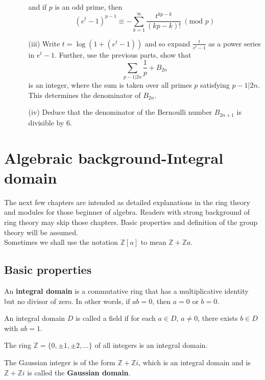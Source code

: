 \begin{enumerate}
\begin{enumerate}
    and if $p$ is an odd prime, then
    $$(e^t-1)^{p-1} \equiv -\sum_{k=1}^\infty \frac{t^{kp-k}}{(kp-k)!}~(\text{mod } p)$$
    \item[(iii)] Write $t=\log{(1+(e^t-1))}$ and so expand $\frac{t}{e^t-1}$ as a power series in
    $e^t-1$. Further, use the previous parts, show that
    $$\sum_{p-1 \big|2n} \frac{1}{p}+B_{2n}$$ is an integer, where the sum is taken over all primes $p$ satisfying $p-1 \big|2n$. This determines the denominator of $B_{2n}$.
    \item[(iv)] Deduce that the denominator of the Bernoulli number $B_{2n+1}$ is divisible by $6$.
    \end{enumerate}
\end{enumerate}

\section{Algebraic background-Integral domain}

The next few chapters are intended as  detailed explanations in the ring theory and modules for those beginner of algebra. Readers with strong background of ring theory may skip those chapters. Basic properties and definition of the group theory will be assumed.\\
Sometimes we shall use the notation $\mathbb{Z}[a]$ to mean $\mathbb{Z}+\mathbb{Z}a$.

\subsection{Basic properties}

\begin{definition} 
An {\bf integral domain} is a commutative ring that has a multiplicative identity but no divisor of zero. In other words, if $ab=0$, then $a=0$ or $b=0$.

An integral domain $D$ is called a field if for each $a \in D$, $a \neq 0$, there exists $b \in D$ with $ab=1$.
\end{definition}

\begin{example} 
The ring $\mathbb{Z}=\{0,\pm1,\pm2,\ldots\}$ of all integers is an integral domain.
\end{example}

\begin{example} 
The Gaussian integer is of the form $\mathbb{Z}+\mathbb{Z}i$, which is an integral domain and is $\mathbb{Z}+\mathbb{Z}i$ is called the {\bf Gaussian domain}.
\end{example}

